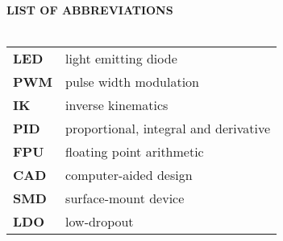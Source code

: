 \newpage
{}
\Large{\textbf{LIST OF ABBREVIATIONS}}\\
\normalsize{}\\
\begin{tabular}{ p{5cm} l}
  \textbf{LED} & light emitting diode\\
  \textbf{PWM} & pulse width modulation\\
  \textbf{IK} & inverse kinematics\\
  \textbf{PID} & proportional, integral and derivative\\
  \textbf{FPU} & floating point arithmetic \\
  \textbf{CAD} & computer-aided design\\
  \textbf{SMD} & surface-mount device\\
  \textbf{LDO} & low-dropout

\end{tabular}